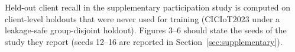Held-out client recall in the supplementary participation study is computed on client-level holdouts that were never used for training (CICIoT2023 under a leakage-safe group-disjoint holdout). Figures 3--6 should state the seeds of the study they report (seeds 12--16 are reported in Section~\ref{sec:supplementary}).

